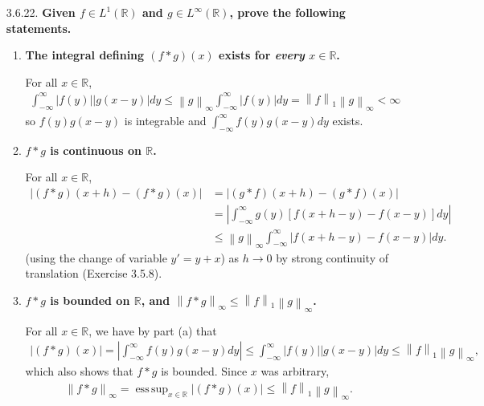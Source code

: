 \documentclass[a4paper,12pt]{article}
\newcommand{\norm}[1]{\left\lVert#1\right\rVert}
\DeclareMathOperator*{\esssup}{ess\,sup}
\begin{document}
\begin{enumerate}
    \item[3.6.22.]
        \boldmath\textbf{Given $f \in L^1(\mathbb{R})$ and $g \in L^\infty(\mathbb{R})$, prove the following statements.
        }\unboldmath \par
        \begin{enumerate}
            \item
                \boldmath\textbf{The integral defining $(f * g)(x)$ exists for \emph{every} $x \in \mathbb{R}$.
                }\unboldmath \par
                For all $x \in \mathbb{R}$,
                \begin{align*}
                    \int_{-\infty}^\infty |f(y)| |g(x - y)| dy \leq \norm{g}_\infty \int_{-\infty}^\infty |f(y)| dy = \norm{f}_1 \norm{g}_\infty < \infty
                \end{align*}
                so $f(y) g(x - y)$ is integrable and $\int_{-\infty}^\infty f(y) g(x - y) dy$ exists.
            \item
                \boldmath\textbf{$f * g$ is continuous on $\mathbb{R}$.
                }\unboldmath \par
                For all $x \in \mathbb{R}$,
                \begin{align*}
                    |(f * g)(x + h) - (f * g)(x)| &= |(g * f)(x + h) - (g * f)(x)| \\
                    &= \left| \int_{-\infty}^\infty g(y) [f(x + h - y) - f(x - y)] dy \right| \\
                    &\leq \norm{g}_\infty \int_{-\infty}^\infty |f(x + h - y) - f(x - y)| dy.
                \end{align*}
                (using the change of variable $y' = y + x$) as $h \to 0$ %
                by strong continuity of translation (Exercise 3.5.8).
            \item
                \boldmath\textbf{$f * g$ is bounded on $\mathbb{R}$, and $\norm{f * g}_\infty \leq \norm{f}_1 \norm{g}_\infty$.
                }\unboldmath \par
                For all $x \in \mathbb{R}$, we have by part (a) that
                \begin{align*}
                    \left| (f * g)(x) \right| = \left| \int_{-\infty}^\infty f(y) g(x - y) dy \right| \leq \int_{-\infty}^\infty |f(y)| |g(x - y)| dy \leq \norm{f}_1 \norm{g}_\infty,
                \end{align*}
                which also shows that $f * g$ is bounded. Since $x$ was arbitrary,
                \begin{align*}
                    \norm{f * g}_\infty = \esssup_{x \in \mathbb{R}} |(f * g)(x)| \leq \norm{f}_1 \norm{g}_\infty.
                \end{align*}
        \end{enumerate}


\end{enumerate}
\end{document}

